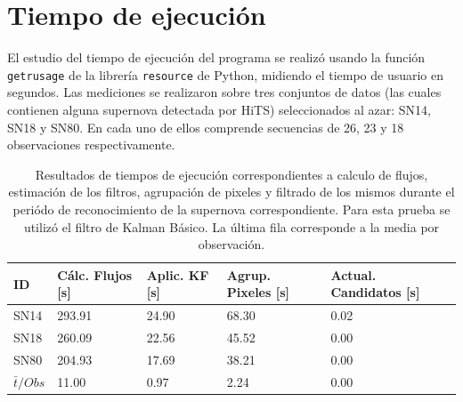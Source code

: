 \section{Tiempo de ejecuci\'on}

El estudio del tiempo de ejecuci\'on del programa se realiz\'o usando la funci\'on \texttt{getrusage} de la librer\'ia \texttt{resource} de Python, midiendo el tiempo de usuario en segundos. Las mediciones se realizaron sobre tres conjuntos de datos (las cuales contienen alguna supernova detectada por HiTS) seleccionados al azar: SN14, SN18 y  SN80. En cada uno de ellos comprende secuencias de 26, 23 y 18 observaciones respectivamente. 

\begin{table}[h!]
\centering
\begin{tabular}{|l|l|l|l|l|}
\hline
\textbf{ID} & \textbf{C\'alc. Flujos [s]} & \textbf{Aplic. KF [s]} &  \textbf{Agrup. Pixeles [s]}  & \textbf{Actual. Candidatos [s]}\\ \hline \hline
SN14        & 293.91            & 24.90        &  68.30 & 0.02 \\ \hline
SN18            & 260.09             & 22.56         &  45.52  & 0.00\\ \hline
SN80            & 204.93             & 17.69         &   38.21 & 0.00 \\ \hline \hline
$\bar{t}/Obs$ & 11.00 &  0.97 & 2.24 & 0.00\\\hline 
\end{tabular}
\label{tab:t1}
\caption{Resultados de tiempos de ejecuci\'on correspondientes a calculo de flujos, estimaci\'on de los filtros, agrupaci\'on de pixeles y filtrado de los mismos durante el peri\'odo de reconocimiento de la supernova correspondiente. Para esta prueba se utiliz\'o el filtro de Kalman B\'asico. La \'ultima fila corresponde a la media por observaci\'on.}
\end{table}

